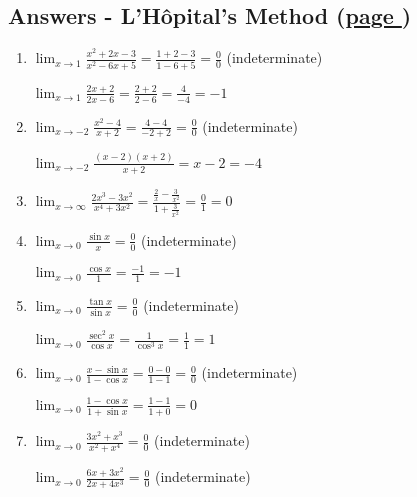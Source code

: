\documentclass[../main.tex]{subfiles}
\begin{document}
\hypertarget{lhopitalanswers}{\subsection*{Answers - L'H\^{o}pital's Method (\hyperlink{lhopitallink}{page \pageref{L'hopital}})}}

\label{L'hopital answers}
\begin{spacing}{2}
\begin{enumerate}[itemsep=0.7cm]
    \item 
    $\displaystyle \lim_{x\rightarrow 1}\frac{x^2+2x-3}{x^2-6x+5}=\frac{1+2-3}{1-6+5}=\frac{0}{0}$ (indeterminate)

    $\displaystyle \lim_{x\rightarrow 1}\frac{2x+2}{2x-6}=\frac{2+2}{2-6}=\frac{4}{-4}=-1$

    \item 
    $\displaystyle \lim_{x\rightarrow -2}\frac{x^2-4}{x+2}=\frac{4-4}{-2+2}=\frac{0}{0}$ (indeterminate)

    $\displaystyle \lim_{x\rightarrow -2}\frac{(x-2)(x+2)}{x+2}=x-2=-4$

    \item 
    $\displaystyle \lim_{x\rightarrow \infty}\frac{2x^3-3x^2}{x^4+3x^2}=\frac{\frac{2}{x}-\frac{3}{x^2}}{1+\frac{3}{x^2}}=\frac{0}{1}=0$

    \item 
    $\displaystyle \lim_{x\rightarrow 0}\frac{\sin{x}}{x}=\frac{0}{0}$ (indeterminate)

    $\displaystyle \lim_{x\rightarrow 0}\frac{\cos{x}}{1}=\frac{-1}{1}=-1$

    \item 
    $\displaystyle \lim_{x\rightarrow 0}\frac{\tan{x}}{\sin{x}}=\frac{0}{0}$ (indeterminate)

    $\displaystyle \lim_{x\rightarrow 0}\frac{\sec^2{x}}{\cos{x}}=\frac{1}{\cos^3{x}}=\frac{1}{1}=1$

    \item 
    $\displaystyle \lim_{x\rightarrow 0}\frac{x-\sin{x}}{1-\cos{x}}=\frac{0-0}{1-1}=\frac{0}{0}$ (indeterminate)

    $\displaystyle \lim_{x\rightarrow 0}\frac{1-\cos{x}}{1+\sin{x}}=\frac{1-1}{1+0}=0$

    \item 
    $\displaystyle \lim_{x\rightarrow 0}\frac{3x^2+x^3}{x^2+x^4}=\frac{0}{0}$ (indeterminate)

    $\displaystyle \lim_{x\rightarrow 0}\frac{6x+3x^2}{2x+4x^3}=\frac{0}{0}$ (indeterminate)


\end{enumerate}
\end{spacing}
\end{document}
